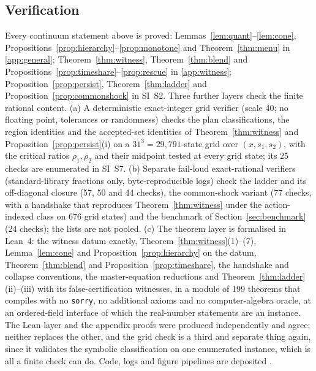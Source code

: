 \subsection{Verification}\label{sec:verification}

Every continuum statement above is proved: Lemmas~\ref{lem:quant}--\ref{lem:cone}, Propositions~\ref{prop:hierarchy}--\ref{prop:monotone} and Theorem~\ref{thm:menu} in \ref{app:general}; Theorem~\ref{thm:witness}, Theorem~\ref{thm:blend} and Propositions~\ref{prop:timeshare}--\ref{prop:rescue} in \ref{app:witness}; Proposition~\ref{prop:persist}, Theorem~\ref{thm:ladder} and Proposition~\ref{prop:commonshock} in SI~S2. Three further layers check the finite rational content. (a) A deterministic exact-integer grid verifier (scale 40; no floating point, tolerances or randomness) checks the plan classifications, the region identities and the accepted-set identities of Theorem~\ref{thm:witness} and Proposition~\ref{prop:persist}(i) on a $31^3=29{,}791$-state grid over $(x,s_1,s_2)$, with the critical ratios $\rho_1,\rho_2$ and their midpoint tested at every grid state; its 25 checks are enumerated in SI~S7. (b) Separate fail-loud exact-rational verifiers (standard-library fractions only, byte-reproducible logs) check the ladder and its off-diagonal closure (57, 50 and 44 checks), the common-shock variant (77 checks, with a handshake that reproduces Theorem~\ref{thm:witness} under the action-indexed class on 676 grid states) and the benchmark of Section~\ref{sec:benchmark} (24 checks); the lists are not pooled. (c) The theorem layer is formalised in Lean~4: the witness datum exactly, Theorem~\ref{thm:witness}(1)--(7), Lemma~\ref{lem:cone} and Proposition~\ref{prop:hierarchy} on the datum, Theorem~\ref{thm:blend} and Proposition~\ref{prop:timeshare}, the handshake and collapse conventions, the master-equation reductions and Theorem~\ref{thm:ladder}(ii)--(iii) with its false-certification witnesses, in a module of 199 theorems that compiles with no \texttt{sorry}, no additional axioms and no computer-algebra oracle, at an ordered-field interface of which the real-number statements are an instance. The Lean layer and the appendix proofs were produced independently and agree; neither replaces the other, and the grid check is a third and separate thing again, since it validates the symbolic classification on one enumerated instance, which is all a finite check can do. Code, logs and figure pipelines are deposited \citep{Abaee2026code}.

